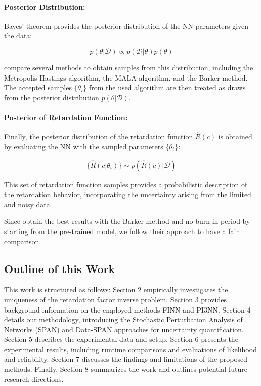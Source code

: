 \documentclass{article}
\begin{document}
\paragraph{Posterior Distribution:}

Bayes' theorem provides the posterior distribution of the NN parameters given the data:

\begin{equation*}
p(\theta | \mathcal{D}) \propto p(\mathcal{D} | \theta) p(\theta)
\end{equation*}

\textcite{finn} compare several methods to obtain samples from this distribution, including the Metropolis-Hastings algorithm, the MALA algorithm, and the Barker method. The accepted samples $\{\theta_i\}$ from the used algorithm are then treated as draws from the posterior distribution $p(\theta | \mathcal{D})$.

\paragraph{Posterior of Retardation Function:}

Finally, the posterior distribution of the retardation function $\hat{R}(c)$ is obtained by evaluating the NN with the sampled parameters $\{\theta_i\}$:

\begin{equation*}
\{\hat{R}(c | \theta_i)\} \sim p(\hat{R}(c) | \mathcal{D})
\end{equation*}

This set of retardation function samples provides a probabilistic description of the retardation behavior, incorporating the uncertainty arising from the limited and noisy data.

Since \textcite{finn} obtain the best results with the Barker method and no burn-in period by starting from the pre-trained model, we follow their approach to have a fair comparison.



\subsection{Outline of this Work}
This work is structured as follows: Section 2 empirically investigates the uniqueness of the retardation factor inverse problem. Section 3 provides background information on the employed methods FINN and PI3NN. Section 4 details our methodology, introducing the Stochastic Perturbation Analysis of Networks (SPAN) and Data-SPAN approaches for uncertainty quantification. Section 5 describes the experimental data and setup. Section 6 presents the experimental results, including runtime comparisons and evaluations of likelihood and reliability. Section 7 discusses the findings and limitations of the proposed methods. Finally, Section 8 summarizes the work and outlines potential future research directions.
\end{document}
